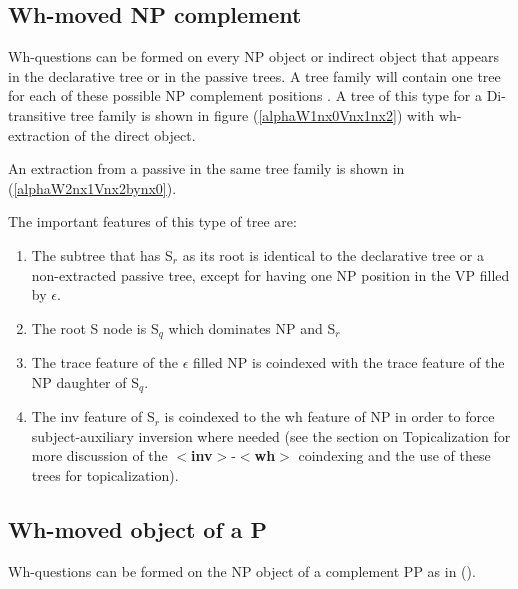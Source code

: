 \subsection{Wh-moved NP complement}
Wh-questions can be formed on every NP object or indirect object that
appears in the declarative tree or in the passive trees.  A tree
family will contain one tree for each of these possible NP complement positions
. A tree of this type for a
Di-transitive tree family is shown in figure (\ref{alphaW1nx0Vnx1nx2}) with wh-extraction of the
direct object. 

\begin{figure}[htbp]
\end{figure}

An extraction from  a passive in the
same tree family is shown in (\ref{alphaW2nx1Vnx2bynx0}).  

\begin{figure}[htbp]
\end{figure}

The important features
of this type of tree are:
\begin{enumerate}
\item The subtree that has S$_{r}$ as its root is identical to the
declarative tree or a non-extracted passive tree, except for having
one NP position in the VP filled by $\epsilon$.
\item The root S node is S$_{q}$ which dominates NP and S$_{r}$
\item The trace feature of the $\epsilon$ filled NP is coindexed with
the trace feature of the NP daughter of S$_{q}$.
\item The inv feature of S$_{r}$ is coindexed to the wh feature of NP
in order to force subject-auxiliary inversion where needed (see the
section on Topicalization for more discussion of the {\bf
$<$inv$>$}-{\bf$<$wh$>$} coindexing
and the use of these trees for topicalization).
\end{enumerate}




\subsection{Wh-moved object of a P}
Wh-questions can be formed on the NP object of a complement PP as in
().

